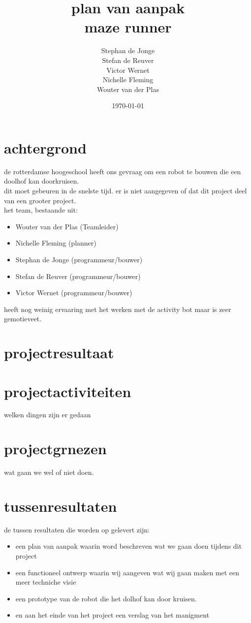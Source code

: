 \documentclass[oneside]{book}
\title{plan van aanpak\\maze runner}
\author{
	Stephan de Jonge\\
	Stefan de Reuver\\
	Victor Wernet\\
	Nichelle Fleming\\
	Wouter van der Plas
}
\date{\today}
\begin{document}
\maketitle
\tableofcontents
{}


\chapter{achtergrond}
de rotterdamse hoogeschool heeft ons gevraag om een robot te bouwen die een doolhof kan doorkruisen.\\
dit moet gebeuren in de snelste tijd. er is niet aangegeven of dat dit project deel van een grooter project.\\
het team, bestaande uit:\\
\begin{itemize}
	\item Wouter van der Plas (Teamleider)
	\item Nichelle Fleming (planner)
	\item Stephan de Jonge (programmeur/bouwer)
	\item Stefan de Reuver (programmeur/bouwer)
	\item Victor Wernet (programmeur/bouwer)
\end{itemize}	
heeft nog weinig ervaaring met het werken met de activity bot maar is zeer gemotieveet.\\


\clearpage
\chapter{projectresultaat}

\clearpage
\chapter{projectactiviteiten}
welken dingen zijn er gedaan
\clearpage
\chapter{projectgrnezen}
wat gaan we wel of niet doen.
\clearpage
\chapter{tussenresultaten}
	de tussen resultaten die worden op gelevert zijn:
\begin{itemize}
	\item een plan van aanpak waarin word beschreven wat we gaan doen tijdens dit project\\
	\item een functioneel ontwerp waarin wij aangeven wat wij gaan maken met een meer techniche visie\\
	\item een prototype van de robot die het dolhof kan door kruisen.\\
	\item en aan het einde van het project een verslag van het manigment
\end{itemize}
\clearpage
\end{document}
